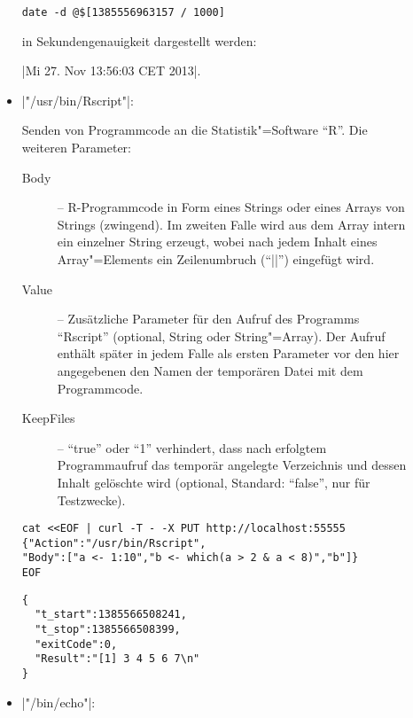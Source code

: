 \documentclass[%
fontsize=11pt
,paper=a4
,twoside
,headings=normal
,numbers=endperiod
,pagesize
]{scrartcl}
\begin{document}
\begin{description}
\begin{itemize}
\begin{lstlisting}[language={}]
date -d @$[1385556963157 / 1000]
\end{lstlisting}

      in Sekundengenauigkeit dargestellt werden: \par
      \quad |Mi 27. Nov 13:56:03 CET 2013|.

    \item |"/usr/bin/Rscript"|: \par

      Senden von Programmcode an die Statistik"=Software "`R"'. Die weiteren
      Parameter:
      \begin{description}

        \item[Body] -- R-Programmcode in Form eines Strings oder eines
        Arrays von Strings (zwingend). Im zweiten Falle wird aus dem Array
        intern ein einzelner String erzeugt, wobei nach jedem Inhalt eines
        Array"=Elements ein Zeilenumbruch ("`|\n|"') eingefügt wird.

        \item[Value] -- Zusätzliche Parameter für den Aufruf des Programms
        "`Rscript"' (optional, String oder String"=Array). Der Aufruf
        enthält später in jedem Falle als ersten Parameter vor den hier
        angegebenen den Namen der temporären Datei mit dem Programmcode.

        \item[KeepFiles] -- "`true"' oder "`1"' verhindert, dass nach
        erfolgtem Programmaufruf das temporär angelegte Verzeichnis und
        dessen Inhalt gelöschte wird (optional, Standard: "`false"', nur für
        Testzwecke).

      \end{description}
\enlargethispage{-2\baselineskip}
\begin{lstlisting}[language={},name=Beispiel:]
cat <<EOF | curl -T - -X PUT http://localhost:55555
{"Action":"/usr/bin/Rscript",
"Body":["a <- 1:10","b <- which(a > 2 & a < 8)","b"]}
EOF
\end{lstlisting}

\begin{lstlisting}[language={},name=Rückgabe:]
{
  "t_start":1385566508241,
  "t_stop":1385566508399,
  "exitCode":0,
  "Result":"[1] 3 4 5 6 7\n"
}
\end{lstlisting}

    \item |"/bin/echo"|: \par


\end{itemize}
\end{description}
\end{document}
